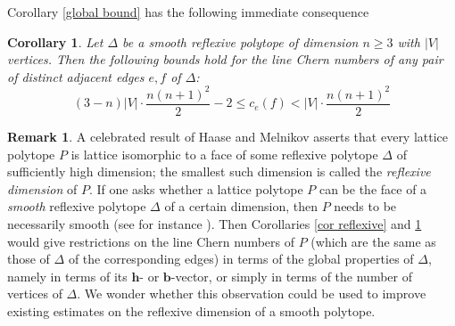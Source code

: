 \documentclass[12pt,a4paper]{amsart}
\newtheorem{cor}[thm]{Corollary}
\theoremstyle{plain}
\theoremstyle{definition}
\newtheorem{rem}[thm]{Remark}
\begin{document}
Corollary \ref{global bound} has the following immediate consequence


\begin{cor}\label{global bound reflexive}
Let $\Delta$ be a smooth reflexive polytope of dimension $n\geq 3$ with $|V|$ vertices. 
Then the following bounds hold for the line Chern numbers of any pair of distinct adjacent edges $e,f$ of $\Delta$:
\begin{equation}
\label{eq:global bound reflexive} (3-n)|V|\cdot \frac{n(n+1)^2}{2}-2\leq c_e(f)< |V|\cdot\frac{n(n+1)^2}{2}
\end{equation}

\end{cor}
\begin{rem}\label{reflexive dimension}
A celebrated result of Haase and Melnikov \cite{HaaseMelnikov2006} asserts that every lattice polytope $P$
 is lattice isomorphic to a face of some reflexive polytope $\Delta$ of sufficiently high dimension; the smallest such dimension
 is called the \emph{reflexive dimension} of $P$. 
 If one asks whether a lattice polytope $P$ can be the face of a \emph{smooth} reflexive polytope $\Delta$ of a certain dimension, then
 $P$ needs to be necessarily smooth (see for instance \cite[Lemma 2.8]{MR3695881}). Then Corollaries \ref{cor reflexive} and \ref{global bound reflexive} 
 would give restrictions on the line Chern numbers of $P$ (which are the same as those of $\Delta$ of the corresponding edges)
  in terms of the global properties of $\Delta$, namely in terms of its $\mathbf{h}$- or $\mathbf{b}$-vector, 
 or simply in terms of the number of vertices of $\Delta$. We wonder whether this observation could be used to 
 improve existing estimates on the reflexive dimension of a smooth polytope.  
 \end{rem}

\end{document}
